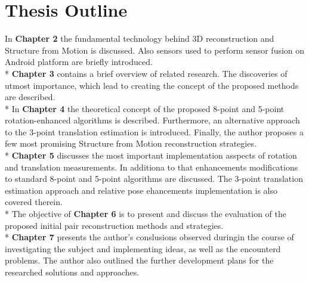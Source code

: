 \section{Thesis Outline}
In \textbf{Chapter 2} the fundamental technology behind 3D reconstruction and Structure from Motion is discussed. Also sensors used to perform sensor fusion on Android platform are briefly introduced.
\\*
\textbf{Chapter 3} contains a brief overview of related research. The discoveries of utmost importance, which lead to creating the concept of the proposed methods are described. 
\\*
In \textbf{Chapter 4} the theoretical concept of the proposed 8-point and 5-point rotation-enhanced algorithms is described. Furthermore, an alternative approach to the 3-point translation estimation is introduced. Finally, the author proposes a few most promising Structure from Motion reconstruction strategies.
\\*
\textbf{Chapter 5} discusses the most important implementation asspects of rotation and translation measurements. In additiona to that enhancements modifications to standard 8-point and 5-point algorithms are discussed. The 3-point translation estimation approach and relative pose ehancements implementation is also covered therein.
\\*
The objective of \textbf{Chapter 6} is to present and discuss the evaluation of the proposed initial pair reconstruction methods and strategies.
\\*
\textbf{Chapter 7} presents the author's conslusions observed duringin the course of investigating the subject and implementing ideas, as well as the encounterd problems. The author also outlined the further development plans for the researched solutions and approaches.




